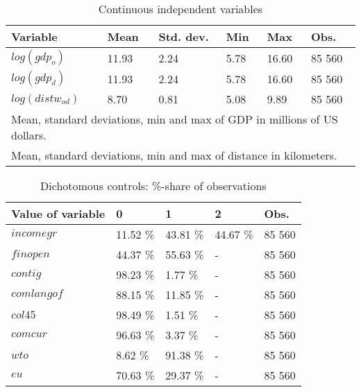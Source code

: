 \documentclass[12pt,a4paper]{article}
\begin{document}
\begin{table}[!h]
\centering
\begin{tabular}{ l l l l l l }
\hline
Variable&Mean&Std. dev.&Min&Max&Obs.\\
\hline
$log(gdp_o)$&11.93&2.24&5.78&16.60&85 560 \\
$log(gdp_d)$&11.93&2.24&5.78&16.60&85 560 \\
$log(distw_{od})$&8.70&0.81&5.08&9.89&85 560 \\
\hline
\multicolumn{6}{l}{\footnotesize Mean, standard deviations, min and max of GDP in millions of US dollars.} \\
\multicolumn{6}{l}{\footnotesize Mean, standard deviations, min and max of distance in kilometers.}
\end{tabular}
\caption{Continuous independent variables}
\label{tab:cont}
\end{table}

\begin{table}[!h]
\centering
\begin{tabular}{ l l l l l}
\hline
Value of variable&0&1&2&Obs.\\
\hline
$incomegr$ & 11.52 \% & 43.81 \% & 44.67 \% &85 560 \\
$finopen$ & 44.37 \% & 55.63 \% & - & 85 560 \\
$contig$ & 98.23 \% & 1.77 \% & - & 85 560 \\
$comlangof$ & 88.15 \% & 11.85 \% & - & 85 560 \\
$col45$ & 98.49 \% & 1.51 \% & - & 85 560 \\
$comcur$ & 96.63 \% & 3.37 \% & - & 85 560 \\
$wto$ & 8.62 \% & 91.38 \% & - & 85 560 \\
$eu$ & 70.63 \% & 29.37 \% & - & 85 560 \\
\hline
\end{tabular}
\caption{Dichotomous controls: \%-share of observations}
\label{tab:dich}
\end{table}
\end{document}
